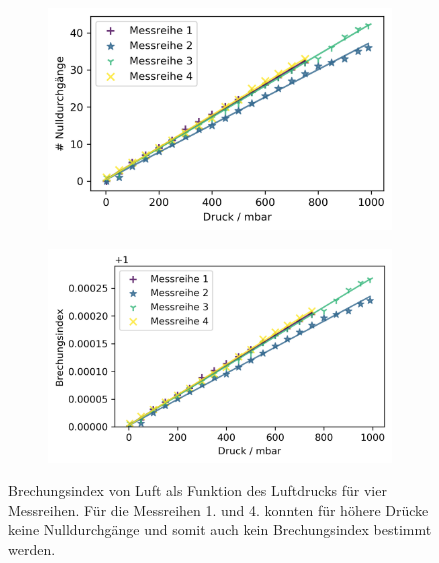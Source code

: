 \begin{figure}[H]
  \centering
  \begin{subfigure}[l]{.49\textwidth}
    \includegraphics[width = \textwidth]{Auswertung/Plots/Messwerte.png}
    \label{fig:Druck_M}
  \end{subfigure}
  \begin{subfigure}[r]{.49\textwidth}
    \includegraphics[width = \textwidth]{Auswertung/Plots/Brechungsindex.png}
    \label{fig:Druck_n}
  \end{subfigure}
  \caption{Brechungsindex von Luft als Funktion des Luftdrucks für vier Messreihen. Für die Messreihen 1. und 4. konnten für höhere Drücke keine Nulldurchgänge und somit auch kein Brechungsindex bestimmt werden.}
  \label{}
\end{figure}
